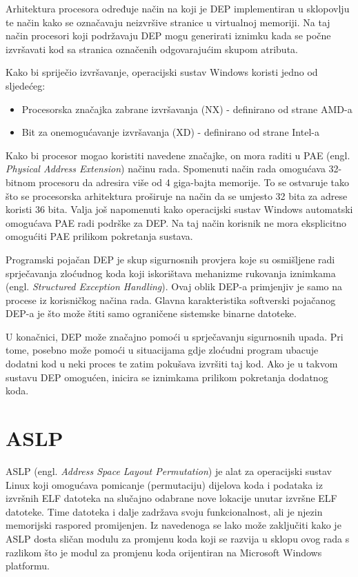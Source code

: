\documentclass[times, utf8, diplomski, numeric]{fer}
\begin{document}
Arhitektura procesora određuje način na koji je DEP implementiran
u sklopovlju te način kako se označavaju neizvršive stranice u virtualnoj memoriji.
Na taj način procesori koji podržavaju DEP mogu generirati
iznimku kada se počne izvršavati kod sa stranica označenih
odgovarajućim skupom atributa.

Kako bi spriječio izvršavanje, operacijski sustav Windows koristi
jedno od sljedećeg:

\begin{itemize}
\item Procesorska značajka zabrane izvršavanja (NX) - definirano od strane AMD-a
\item Bit za onemogućavanje izvršavanja (XD) - definirano od strane Intel-a
\end{itemize}

Kako bi procesor mogao koristiti navedene značajke, on mora
raditi u PAE (engl. \emph{Physical Address
Extension}) \citep{pae_ms} načinu rada. Spomenuti način rada
omogućava 32-bitnom procesoru da adresira više od 4 giga-bajta
memorije. To se ostvaruje tako što se procesorska arhitektura
proširuje na način da se umjesto 32 bita za adrese koristi 36
bita. Valja još napomenuti kako operacijski sustav Windows
automatski omogućava PAE radi podrške za DEP. Na taj način korisnik
ne mora eksplicitno omogućiti PAE prilikom pokretanja sustava.

Programski pojačan DEP je skup sigurnosnih provjera koje su
osmišljene radi sprječavanja zloćudnog koda koji iskorištava
mehanizme rukovanja iznimkama (engl. \emph{Structured Exception
Handling}). Ovaj oblik DEP-a primjenjiv je samo na procese iz
korisničkog načina rada. Glavna karakteristika softverski
pojačanog DEP-a je što može štiti samo ograničene sistemske
binarne datoteke.

U konačnici, DEP može značajno pomoći u sprječavanju sigurnosnih
upada. Pri tome, posebno može pomoći u situacijama gdje zloćudni
program ubacuje dodatni kod u neki proces te zatim pokušava
izvršiti taj kod. Ako je u takvom sustavu DEP omogućen, inicira
se iznimkama prilikom pokretanja dodatnog koda.

\section{ASLP}
\label{sct:aslp}

ASLP \citep{aslp} (engl. \emph{Address Space Layout Permutation}) 
je alat za operacijski sustav Linux koji omogućava pomicanje 
(permutaciju) dijelova koda i podataka iz izvršnih ELF datoteka
na slučajno odabrane nove lokacije unutar izvršne ELF datoteke.
Time datoteka i dalje zadržava svoju funkcionalnost, ali je
njezin memorijski raspored promijenjen. Iz navedenoga se lako
može zaključiti kako je ASLP dosta sličan modulu za promjenu koda
koji se razvija u sklopu ovog rada s razlikom što je modul za
promjenu koda orijentiran na Microsoft Windows platformu. 
\end{document}
